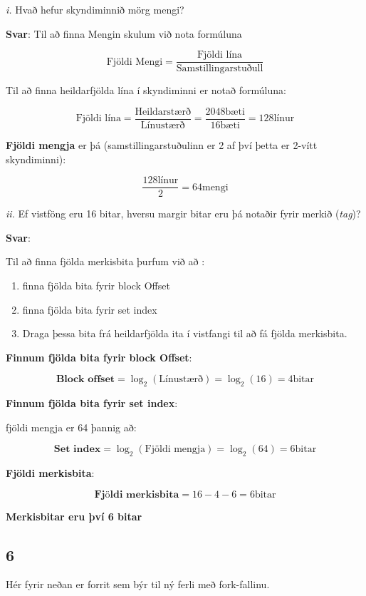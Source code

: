 \documentclass{article}
\begin{document}
\textit{i.} Hvað hefur skyndiminnið mörg
mengi? 

\textbf{Svar}:
Til að finna Mengin skulum við nota formúluna

\[ \text{Fjöldi Mengi} = \frac{\text{Fjöldi lína}}{\text{Samstillingarstuðull}} \]

Til að finna heildarfjölda lína í skyndiminni er notað formúluna:

\[ \text{Fjöldi lína} = \frac{\text{Heildarstærð}}{\text{Línustærð}} = \frac{2048 \text{bæti}}{16 \text{bæti}} = 128 \text{línur}  \]

\textbf{Fjöldi mengja} er þá (samstillingarstuðulinn er 2 af því þetta er 2-vítt skyndiminni):

\[ \frac{128 \text{línur}}{2} = 64 \text{mengi} \]

\textit{ii.} Ef vistföng eru 16 bitar, hversu margir bitar eru þá notaðir fyrir
merkið (\textit{tag})?

\textbf{Svar}:

Til að finna fjölda merkisbita þurfum við að :

\begin{enumerate}
    \item finna fjölda bita fyrir block Offset
    \item finna fjölda bita fyrir set index
    \item Draga þessa bita frá heildarfjölda ita í vistfangi til að fá fjölda merkisbita.
\end{enumerate}

\textbf{Finnum fjölda bita fyrir block Offset}:

\[\textbf{Block offset} = \log_2(\text{Línustærð}) = \log_2(16) = 4 \text{bitar}\]

\textbf{Finnum fjölda bita fyrir set index}:

fjöldi mengja er 64 þannig að:

\[\textbf{Set index} = \log_2(\text{Fjöldi mengja}) = \log_2(64) = 6 \text{bitar}\]

\textbf{Fjöldi merkisbita}:

\[\textbf{Fjöldi merkisbita} = 16 - 4 - 6 = 6 \text{bitar}\]

\textbf{Merkisbitar eru því 6 bitar}

\newpage

\subsection{6} 

Hér fyrir neðan er forrit sem býr til ný ferli með fork-fallinu.
\end{document}
